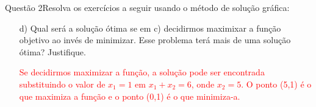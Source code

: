 \documentclass[12pt]{article}
\begin{document}
\begin{section}{Questão 2}{Resolva os exercícios a seguir usando o método de solução gráfica:}
\begin{itemize}
\textcolor{red}{Conforme o gráfico acima, a única reta que intercepta a região na cor amarela é a reta verde, da equação $-3x_1 + 3x_2 = 3$, cujo ponto é (0,1).}

\item[d)] Qual será a solução ótima se em c) decidirmos maximixar a função objetivo ao invés de minimizar. Esse problema terá mais de uma solução ótima? Justifique.

\textcolor{red}{Se decidirmos maximizar a função, a solução pode ser encontrada substituindo o valor de $x_1 = 1$ em $x_1 + x_2 = 6$, onde $x_2 = 5$. O ponto (5,1) é o que maximiza a função e o ponto (0,1) é o que minimiza-a.}

\end{itemize}
\end{section}

\newpage
\end{document}
